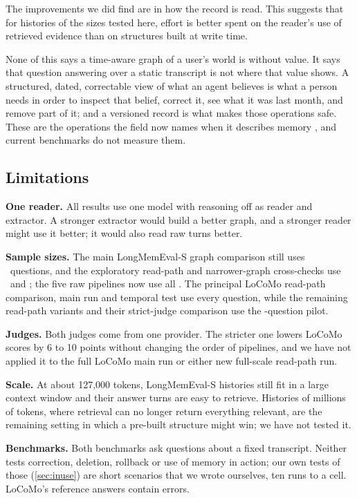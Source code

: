 \documentclass[11pt,letterpaper]{article}
\begin{document}
The improvements we did find are in how the record is read. This suggests that for histories of the sizes tested here, effort is better spent on the reader's use of retrieved evidence than on structures built at write time.

None of this says a time-aware graph of a user's world is without value. It says that question answering over a static transcript is not where that value shows. A structured, dated, correctable view of what an agent believes is what a person needs in order to inspect that belief, correct it, see what it was last month, and remove part of it; and a versioned record is what makes those operations safe. These are the operations the field now names when it describes memory \citep{hu2025memoryage}, and current benchmarks do not measure them.

\subsection{Limitations}

\textbf{One reader.} All results use one model with reasoning off as reader and extractor. A stronger extractor would build a better graph, and a stronger reader might use it better; it would also read raw turns better.

\textbf{Sample sizes.} The main LongMemEval-S graph comparison still uses \numLmeQuestions\ questions, and the exploratory read-path and narrower-graph cross-checks use \numReadLmeQuestions\ and \numRoleLmeQuestions; the five raw pipelines now use all \numFullLmeQuestions. The principal LoCoMo read-path comparison, main run and temporal test use every question, while the remaining read-path variants and their strict-judge comparison use the \numReadQuestions-question pilot.

\textbf{Judges.} Both judges come from one provider. The stricter one lowers LoCoMo scores by 6 to 10 points without changing the order of pipelines, and we have not applied it to the full LoCoMo main run or either new full-scale read-path run.

\textbf{Scale.} At about 127,000 tokens, LongMemEval-S histories still fit in a large context window and their answer turns are easy to retrieve. Histories of millions of tokens, where retrieval can no longer return everything relevant, are the remaining setting in which a pre-built structure might win; we have not tested it.

\textbf{Benchmarks.} Both benchmarks ask questions about a fixed transcript. Neither tests correction, deletion, rollback or use of memory in action; our own tests of those (\cref{sec:inuse}) are short scenarios that we wrote ourselves, ten runs to a cell. LoCoMo's reference answers contain errors.
\end{document}
